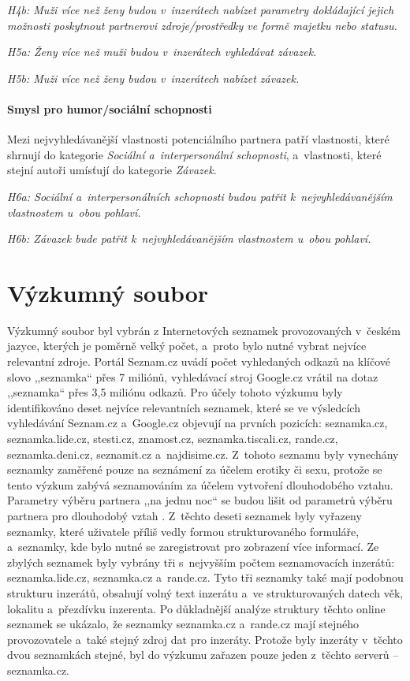 \documentclass[a4paper, 12pt, notitlepage, oneside, numbers=noenddot]{report}
\begin{document}
\emph{H4b: Muži více než ženy budou v~inzerátech nabízet parametry
  dokládající jejich možnosti poskytnout partnerovi zdroje/prostředky
  ve formě majetku nebo statusu.}

\emph{H5a: Ženy více než muži budou v~inzerátech vyhledávat závazek.}

\emph{H5b: Muži více než ženy budou v~inzerátech nabízet závazek.}

\paragraph{Smysl pro humor/sociální schopnosti}

Mezi nejvyhledávanější vlastnosti potenciál\-ního partnera patří
vlastnosti, které \citet{BarrettDunbarLycett2007} shrnují do kategorie
\emph{Sociální a~interpersonální schopnosti}, a~vlastnosti, které
stejní autoři umísťují do kategorie \emph{Závazek}.

\emph{H6a: Sociální a~interpersonálních schopnosti budou patřit
  k~nejvyhledávanějším vlastnostem u~obou pohlaví.}

\emph{H6b: Závazek bude patřit k~nejvyhledávanějším vlastnostem u~obou
  pohlaví.}

\section{Výzkumný soubor}
Výzkumný soubor byl vybrán z Internetových seznamek provozovaných
v~českém jazyce, kterých je poměrně velký počet, a~proto bylo nutné
vybrat nejvíce relevantní zdroje.  Portál Seznam.cz uvádí počet
vyhledaných odkazů na klíčové slovo ,,seznamka`` přes 7 miliónů,
vy\-hle\-dávací stroj Google.cz vrátil na dotaz ,,seznamka`` přes 3,5
miliónu odkazů.  Pro účely tohoto výzkumu byly identifikováno deset
nejvíce relevantních seznamek, které se ve výsledcích vyhledávání
Seznam.cz a~Google.cz objevují na prvních pozicích: seznamka.cz,
seznamka.lide.cz, stesti.cz, znamost.cz, seznamka.tiscali.cz,
rande.cz, seznamka.deni.cz, seznamit.cz a~najdisime.cz.  Z~tohoto
seznamu byly vynechány seznamky zaměřené pouze na seznámení za účelem
erotiky či sexu, protože se tento výzkum zabývá seznamováním za účelem
vytvoření dlouhodobého vztahu.  Parametry výběru partnera ,,na jednu
noc`` se budou lišit od parametrů výběru partnera pro dlouhodobý vztah
\citep{Buss2007}.  Z~těchto deseti seznamek byly vyřazeny seznamky,
které uživatele příliš vedly formou strukturovaného formuláře,
a~seznamky, kde bylo nutné se zaregistrovat pro zobrazení více
informací.  Ze zbylých seznamek byly vybrány tři s~nejvyšším počtem
seznamovacích inzerátů: seznamka.lide.cz, seznamka.cz a~rande.cz.
Tyto tři seznamky také mají podobnou strukturu inzerátů, obsahují
volný text inzerátu a~ve strukturovaných datech věk, lokalitu
a~přezdívku inzerenta.  Po důkladnější analýze struktury těchto online
seznamek se ukázalo, že seznamky seznamka.cz a~rande.cz mají stejného
provozovatele a~také stejný zdroj dat pro inzeráty.  Protože byly
inzeráty v~těchto dvou seznamkách stejné, byl do výzkumu zařazen pouze
jeden z~těchto serverů -- seznamka.cz.
\end{document}
